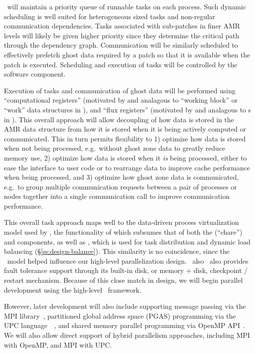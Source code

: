\documentclass[10pt,twocolumn]{article}
\begin{document}
\cello\ will maintain a priority queue of runnable tasks on each
process.  Such dynamic scheduling is well suited for heterogeneous
sized tasks and non-regular communication dependencies. Tasks
associated with sub-patches in finer AMR levels will likely be given
higher priority since they determine the critical path through the
dependency graph.  Communication will be similarly scheduled to
effectively prefetch ghost data required by a patch so that it is
available when the patch is executed.  Scheduling and execution of
tasks will be controlled by the  software component.

Execution of tasks and communication of ghost data will be performed
using ``computational registers'' (motivated by and analagous to
``working block'' or ``work'' data structures in \paramesh), and
``flux registers'' (motivated by and analagous to
s in \chombo).  This overall approach will
allow decoupling of how data is stored in the AMR data structure from
how it is stored when it is being actively computed or communicated.
This in turn permits flexibility to 1) optimize how data is stored
when not being processed, e.g.~without ghost zone data to greatly
reduce memory use, 2) optimize how data is stored when it \textit{is}
being processed, either to ease the interface to user code or to
rearrange data to improve cache performance when being processed, and
3) optimize how ghost zone data is communicated, e.g.~to group
multiple communication requests between a pair of processes or nodes
together into a single communication call to improve communication
performance.

This overall task approach maps well to the data-driven process
virtualization model used by \charm, the functionality of which
subsumes that of both the  (``chare'') and 
components, as well as , which is used for task
distribution and dynamic load balancing (\S\ref{ss:design-balance}).  This
similarity is no coincidence, since the \charm\ model helped influence
our high-level parallelization design.  \charm\ also \charm\ also
provides fault tolerance support through its built-in disk, or memory
+ disk, checkpoint / restart mechanism.  Because of this close match
in design, we will begin parallel development using the high-level
\charm\ framework.

However, later development will also include supporting message
passing via the MPI library~\cite{wwwmpi}, partitioned global address
space (PGAS) programming via the UPC
language~\cite{wwwupc}~\cite{upc}, and shared memory parallel
programming via OpenMP API~\cite{wwwopenmp}.  We will also allow
direct support of hybrid parallelism approaches, including MPI with
OpenMP, and MPI with UPC.
\end{document}
